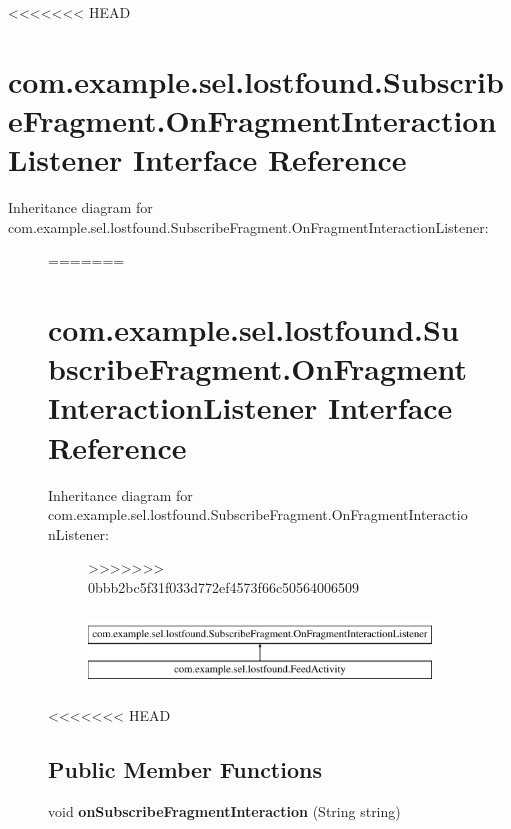 <<<<<<< HEAD
\hypertarget{interfacecom_1_1example_1_1sel_1_1lostfound_1_1SubscribeFragment_1_1OnFragmentInteractionListener}{\section{com.\-example.\-sel.\-lostfound.\-Subscribe\-Fragment.\-On\-Fragment\-Interaction\-Listener Interface Reference}
\label{interfacecom_1_1example_1_1sel_1_1lostfound_1_1SubscribeFragment_1_1OnFragmentInteractionListener}
}
Inheritance diagram for com.\-example.\-sel.\-lostfound.\-Subscribe\-Fragment.\-On\-Fragment\-Interaction\-Listener\-:\begin{figure}[H]
=======
\hypertarget{interfacecom_1_1example_1_1sel_1_1lostfound_1_1SubscribeFragment_1_1OnFragmentInteractionListener}{\section{com.\-example.\-sel.\-lostfound.\-Subscribe\-Fragment.\-On\-Fragment\-Interaction\-Listener \-Interface \-Reference}
\label{interfacecom_1_1example_1_1sel_1_1lostfound_1_1SubscribeFragment_1_1OnFragmentInteractionListener}
}
\-Inheritance diagram for com.\-example.\-sel.\-lostfound.\-Subscribe\-Fragment.\-On\-Fragment\-Interaction\-Listener\-:\begin{figure}[H]
>>>>>>> 0bbb2bc5f31f033d772ef4573f66c50564006509
\begin{center}
\leavevmode
\includegraphics[height=2.000000cm]{interfacecom_1_1example_1_1sel_1_1lostfound_1_1SubscribeFragment_1_1OnFragmentInteractionListener}
\end{center}
\end{figure}
<<<<<<< HEAD
\subsection*{Public Member Functions}
\begin{DoxyCompactItemize}
\item 
\hypertarget{interfacecom_1_1example_1_1sel_1_1lostfound_1_1SubscribeFragment_1_1OnFragmentInteractionListener_a49e52bf52ac045228eda481eaa5ad3a3}{void {\bfseries on\-Subscribe\-Fragment\-Interaction} (String string)}\label{interfacecom_1_1example_1_1sel_1_1lostfound_1_1SubscribeFragment_1_1OnFragmentInteractionListener_a49e52bf52ac045228eda481eaa5ad3a3}


\end{DoxyCompactItemize}
\end{figure}
